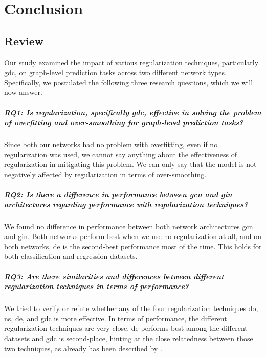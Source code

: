 %
\chapter{Conclusion}
\label{sec:conclusion}




\section{Review}
\label{sec:conclusion:review}

Our study examined the impact of various regularization techniques, particularly \ac{gdc}, on graph-level prediction tasks across two different network types.
Specifically, we postulated the following three research questions, which we will now answer.

\paragraph{RQ1: Is regularization, specifically \acs*{gdc}, effective in solving the problem of overfitting and over-smoothing for graph-level prediction tasks?}
Since both our networks had no problem with overfitting, even if no regularization was used, we cannot say anything about the effectiveness of regularization in mitigating this problem.
We can only say that the model is not negatively affected by regularization in terms of over-smoothing.

\paragraph{RQ2: Is there a difference in performance between \acs*{gcn} and \acs*{gin} architectures regarding performance with regularization techniques?}

We found no difference in performance between both network architectures \ac{gcn} and \ac{gin}.
Both networks perform best when we use no regularization at all, and on both networks, \ac{de} is the second-best performance most of the time.
This holds for both classification and regression datasets.


\paragraph{RQ3: Are there similarities and differences between different regularization techniques in terms of performance?}
We tried to verify or refute whether any of the four regularization techniques \ac{do}, \ac{ns}, \ac{de}, and \ac{gdc} is more effective.
In terms of performance, the different regularization techniques are very close.
\Ac{de} performs best among the different datasets and \ac{gdc} is second-place, hinting at the close relatedness between those two techniques, as already has been described by \citep{Hasanzadeh2020}.


